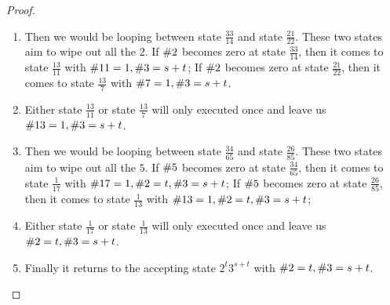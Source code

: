 \begin{proof}
\begin{enumerate}
        \item Then we would be looping between state $\frac{33}{14}$ and state $\frac{21}{22}$. These two states aim to wipe out all the $2$. If $\II$ becomes zero at state $\frac{33}{14}$, then it comes to state $\frac{13}{11}$ with $\XI = 1, \III = s + t$; If $\II$ becomes zero at state $\frac{21}{22}$, then it comes to state $\frac{13}{7}$ with $\VII = 1, \III = s + t$.
        \item Either state $\frac{13}{11}$ or state $\frac{13}{7}$ will only executed once and leave us $\XIII = 1, \III = s + t$. 
        \item Then we would be looping between state $\frac{34}{65}$ and state $\frac{26}{85}$. These two states aim to wipe out all the $5$. If $\V$ becomes zero at state $\frac{34}{65}$, then it comes to state $\frac{1}{17}$ with $\XVII = 1, \II = t, \III = s + t$; If $\V$ becomes zero at state $\frac{26}{85}$, then it comes to state $\frac{1}{13}$ with $\XIII = 1, \II = t, \III = s + t$;
        \item Either state $\frac{1}{17}$ or state $\frac{1}{13}$ will only executed once and leave us $\II = t, \III = s + t$. 
        \item Finally it returns to the accepting state $2^t3^{s+t}$ with $\II = t, \III = s + t$. 
    \end{enumerate}
\end{proof}


